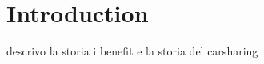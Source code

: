 
\chapter{Introduction}  %
\label{chap:1_introduction}
    \graphicspath{{Chapter1/}}


descrivo la storia i benefit e la storia del carsharing


